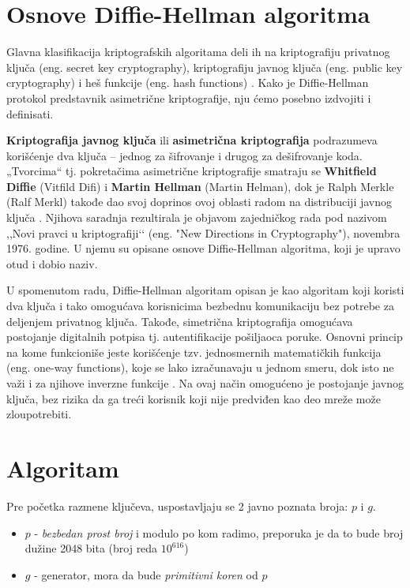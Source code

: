 \documentclass[a4paper]{article}
\begin{document}
\section{Osnove Diffie-Hellman algoritma}
Glavna klasifikacija kriptografskih algoritama deli ih na kriptografiju privatnog ključa (eng. secret key cryptography), kriptografiju javnog ključa (eng. public key cryptography) i heš funkcije (eng. hash functions) \cite{cryptography}. Kako je Diffie-Hellman protokol predstavnik asimetrične kriptografije, nju ćemo posebno izdvojiti i definisati.

\textbf{Kriptografija javnog ključa} ili \textbf{asimetrična kriptografija} podrazumeva korišćenje dva ključa – jednog za šifrovanje i drugog za dešifrovanje koda. „Tvorcima“ tj. pokretačima asimetrične kriptografije smatraju se \textbf{Whitfield Diffie} (Vitfild Difi) i \textbf{Martin Hellman} (Martin Helman), dok je Ralph Merkle (Ralf Merkl) takođe dao svoj doprinos ovoj oblasti radom na distribuciji javnog ključa \cite{Diffie-Hellman}. Njihova saradnja rezultirala je objavom zajedničkog rada pod nazivom ,,Novi pravci u kriptografiji‘‘ (eng. "New Directions in Cryptography"), novembra 1976. godine. U njemu su opisane osnove Diffie-Hellman algoritma, koji je upravo otud i dobio naziv. %

U spomenutom radu, Diffie-Hellman algoritam opisan je kao algoritam koji koristi dva ključa i tako omogućava korisnicima bezbednu komunikaciju bez potrebe za deljenjem privatnog ključa. Takođe, simetrična kriptografija omogućava postojanje digitalnih potpisa tj. autentifikacije pošiljaoca poruke. Osnovni princip na kome funkcioniše jeste korišćenje tzv. jednosmernih matematičkih funkcija (eng. one-way functions), koje se lako izračunavaju u jednom smeru, dok isto ne važi i za njihove inverzne funkcije \cite{cryptography}. Na ovaj način omogućeno je postojanje javnog ključa, bez rizika da ga treći korisnik koji nije predviđen kao deo mreže može zloupotrebiti. 



\section{Algoritam}
\label{sec:algoritam}

Pre početka razmene ključeva, uspostavljaju se 2 javno poznata broja: $p$ i $g$.
\begin{itemize}

    \item $p$ - \emph{bezbedan prost broj} i modulo po kom radimo, preporuka je da 
        to bude broj dužine 2048 bita (broj reda $10^{616}$) \cite{logjam}
    \item $g$ - generator, mora da bude \emph{primitivni koren} od $p$

\end{itemize}
\end{document}
